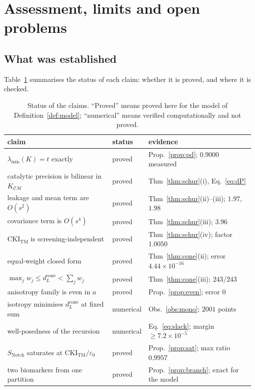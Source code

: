 \documentclass[11pt,reqno]{amsart}
\theoremstyle{plain}
\theoremstyle{definition}
\theoremstyle{remark}
\numberwithin{equation}{section}
\newcommand{\CKI}{\mathrm{CKI}}
\newcommand{\CKItm}{\CKI_{\mathrm{TM}}}
\newcommand{\Snotch}{S_{\mathrm{Notch}}}
\newcommand{\dcone}{d_L^{\mathrm{cone}}}
\newcommand{\CC}{\mathcal{C}}
\newcommand{\MM}{\mathcal{M}}
\begin{document}
\section{Assessment, limits and open problems}
\label{sec:assess}

\subsection{What was established}
Table~\ref{tab:assess} summarises the status of each claim: whether it is proved, and where it is checked.

\begin{table}[ht]
\centering\small\setlength{\tabcolsep}{5pt}
\caption{Status of the claims. ``Proved'' means proved here for the model of Definition~\ref{def:model}; ``numerical'' means verified computationally and not proved.}
\label{tab:assess}
\begin{tabular}{@{}l l l@{}}
\toprule
claim & status & evidence \\
\midrule
$\lambda_{\min}(K)=t$ exactly & proved & Prop.~\ref{prop:pd}; $0.9000$ measured \\
catalytic precision is bilinear in $K_{\CC\MM}$ & proved & Thm~\ref{thm:schur}(i), Eq.~\eqref{eq:dP} \\
leakage and mean term are $O(s^2)$ & proved & Thm~\ref{thm:schur}(ii)--(iii); $1.97$, $1.98$ \\
covariance term is $O(s^4)$ & proved & Thm~\ref{thm:schur}(iii); $3.96$ \\
$\CKItm$ is screening-independent & proved & Thm~\ref{thm:schur}(iv); factor $1.0050$ \\
equal-weight closed form & proved & Thm~\ref{thm:cone}(ii); error $4.44\times10^{-16}$ \\
$\max_jw_j\le\dcone<\sum_jw_j$ & proved & Thm~\ref{thm:cone}(iii); $243/243$ \\
anisotropy family is even in $a$ & proved & Prop.~\ref{prop:even}; error $0$ \\
isotropy minimises $\dcone$ at fixed sum & numerical & Obs.~\ref{obs:mono}; $2001$ points \\
well-posedness of the recursion & numerical & Eq.~\eqref{eq:slack}; margin $\ge7.2\times10^{-5}$ \\
$\Snotch$ saturates at $\CKItm/\varepsilon_0$ & proved & Prop.~\ref{prop:sat}; max ratio $0.9957$ \\
two biomarkers from one partition & proved & Prop.~\ref{prop:branch}; exact for the model \\

\end{tabular}
\end{table}
\end{document}

